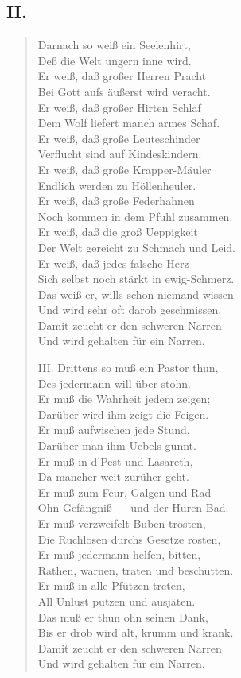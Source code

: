 \subsection{II.}

\begin{verse}
Darnach so weiß ein Seelenhirt,\\
Deß die Welt ungern inne wird.\\
Er weiß, daß großer Herren Pracht\\
Bei Gott aufs äußerst wird veracht.\\
Er weiß, daß großer Hirten Schlaf\\
Dem Wolf liefert manch armes Schaf.\\
Er weiß, daß große Leuteschinder\\
Verflucht sind auf Kindeskindern.\\
Er weiß, daß große Krapper-Mäuler\\
Endlich werden zu Höllenheuler.\\
Er weiß, daß große Federhahnen\\
Noch kommen in dem Pfuhl zusammen.\\
Er weiß, daß die groß Ueppigkeit\\
Der Welt gereicht zu Schmach und Leid.\\
Er weiß, daß jedes falsche Herz\\
Sich selbst noch stärkt in ewig-Schmerz.\\
Das weiß er, wills schon niemand wissen\\
Und wird sehr oft darob geschmissen.\\
Damit zeucht er den schweren Narren\\
Und wird gehalten für ein Narren.

III. Drittens so muß ein Pastor thun,\\
Des jedermann will über stohn.\\
Er muß die Wahrheit jedem zeigen;\\
Darüber wird ihm zeigt die Feigen.\\
Er muß aufwischen jede Stund,\\
Darüber man ihm Uebels gunnt.\\
Er muß in d’Pest und Lasareth,\\
Da mancher weit zurüher geht.\\
Er muß zum Feur, Galgen und Rad\\
Ohn Gefängniß — und der Huren Bad.\\
Er muß verzweifelt Buben trösten,\\
Die Ruchlosen durchs Gesetze rösten,\\
Er muß jedermann helfen, bitten,\\
Rathen, warnen, traten und beschütten.\\
Er muß in alle Pfützen treten,\\
All Unlust putzen und ausjäten.\\
Das muß er thun ohn seinen Dank,\\
Bis er drob wird alt, krumm und krank.\\
Damit zeucht er den schweren Narren\\
Und wird gehalten für ein Narren.


\end{verse}
